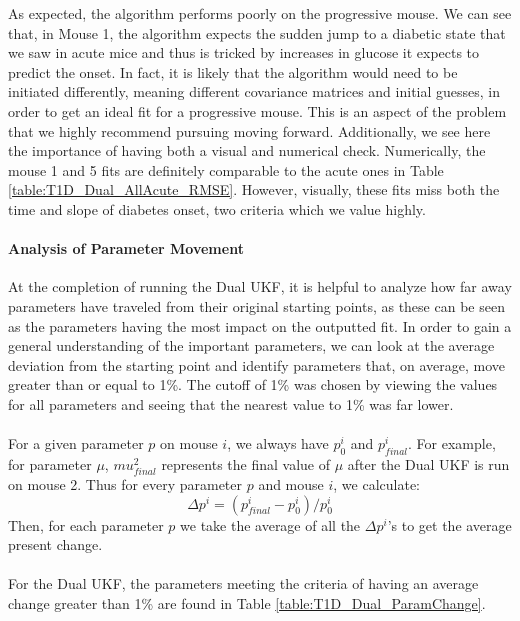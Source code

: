 As expected, the algorithm performs poorly on the progressive mouse. We can see that, in Mouse 1, the algorithm expects the sudden jump to a diabetic state that we saw in acute mice and thus is tricked by increases in glucose it expects to predict the onset. In fact, it is likely that the algorithm would need to be initiated differently, meaning different covariance matrices and initial guesses, in order to get an ideal fit for a progressive mouse. This is an aspect of the problem that we highly recommend pursuing moving forward. Additionally, we see here the importance of having both a visual and numerical check. Numerically, the mouse 1 and 5 fits are definitely comparable to the acute ones in Table \ref{table:T1D_Dual_AllAcute_RMSE}. However, visually, these fits miss both the time and slope of diabetes onset, two criteria which we value highly.

\paragraph{Analysis of Parameter Movement}
At the completion of running the Dual UKF, it is helpful to analyze how far away parameters have traveled from their original starting points, as these can be seen as the parameters having the most impact on the outputted fit. In order to gain a general understanding of the important parameters, we can look at the average deviation from the starting point and identify parameters that, on average, move greater than or equal to 1\%. The cutoff of 1\% was chosen by viewing the values for all parameters and seeing that the nearest value to 1\% was far lower.\\
\\
For a given parameter $p$ on mouse $i$, we always have $p^i_0$ and $p^i_{final}$. For example, for parameter $\mu$, $mu^2_{final}$ represents the final value of $\mu$ after the Dual UKF is run on mouse 2. Thus for every parameter $p$ and mouse $i$, we calculate:
\begin{equation} \label{eq:UKF_Param_Change}
    \Delta p^i = (p^i_{final} - p^i_0)/p^i_0 
\end{equation}
Then, for each parameter $p$ we take the average of all the $\Delta p^i$'s to get the average present change.\\
\\
For the Dual UKF, the parameters meeting the criteria of having an average change greater than 1\% are found in Table \ref{table:T1D_Dual_ParamChange}.

